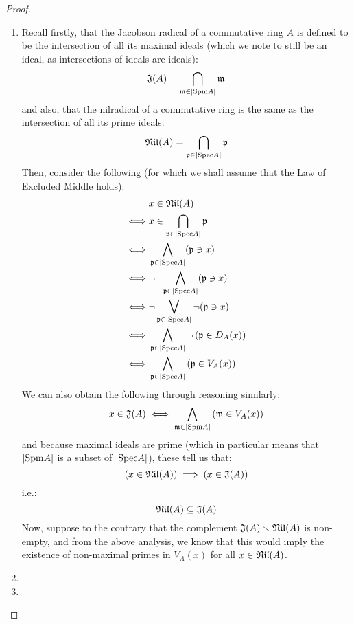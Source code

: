 \begin{proof}
\begin{enumerate}
                        One thing to note is that this proof does not imply that every Artinian rings only have finitely many proper ideals. 
                        \item Recall firstly, that the Jacobson radical of a commutative ring $A$ is defined to be the intersection of all its maximal ideals (which we note to still be an ideal, as intersections of ideals are ideals):
                            $$\mathfrak{J}(A) = \bigcap_{\mathfrak{m} \in |\mathrm{Spm} A|} \mathfrak{m}$$
                        and also, that the nilradical of a commutative ring is the same as the intersection of all its prime ideals:
                            $$\mathfrak{Nil}(A) = \bigcap_{\mathfrak{p} \in |\mathrm{Spec} A|} \mathfrak{p}$$
                        Then, consider the following (for which we shall assume that the Law of Excluded Middle holds):
                            $$
                                \begin{aligned}
                                    & x \in \mathfrak{Nil}(A)
                                    \\
                                    \iff & x \in \bigcap_{\mathfrak{p} \in |\mathrm{Spec} A|} \mathfrak{p}
                                    \\
                                    \iff & \bigwedge_{\mathfrak{p} \in |\mathrm{Spec} A|} (\mathfrak{p} \ni x)
                                    \\
                                    \iff & \neg \neg \bigwedge_{\mathfrak{p} \in |\mathrm{Spec} A|} (\mathfrak{p} \ni x)
                                    \\
                                    \iff & \neg \bigvee_{\mathfrak{p} \in |\mathrm{Spec} A|} \neg (\mathfrak{p} \ni x)
                                    \\
                                    \iff & \bigwedge_{\mathfrak{p} \in |\mathrm{Spec} A|} \neg \left(\mathfrak{p} \in D_A(x)\right)
                                    \\
                                    \iff & \bigwedge_{\mathfrak{p} \in |\mathrm{Spec} A|} \left(\mathfrak{p} \in V_A(x)\right)
                                \end{aligned}
                            $$
                        We can also obtain the following through reasoning similarly:
                            $$x \in \mathfrak{J}(A) \iff \bigwedge_{\mathfrak{m} \in |\mathrm{Spm} A|} \left(\mathfrak{m} \in V_A(x)\right)$$
                        and because maximal ideals are prime (which in particular means that $|\mathrm{Spm} A|$ is a subset of $|\mathrm{Spec} A|$), these tell us that:
                            $$\left(x \in \mathfrak{Nil}(A)\right) \implies \left(x \in \mathfrak{J}(A)\right)$$
                        i.e.:
                            $$\mathfrak{Nil}(A) \subseteq \mathfrak{J}(A)$$
                        Now, suppose to the contrary that the complement $\mathfrak{J}(A) \smallsetminus \mathfrak{Nil}(A)$ is non-empty, and from the above analysis, we know that this would imply the existence of non-maximal primes in $V_A(x)$ for all $x \in \mathfrak{Nil}(A)$.  
                        \item
                        \item 
                    \end{enumerate}
                \end{proof}

